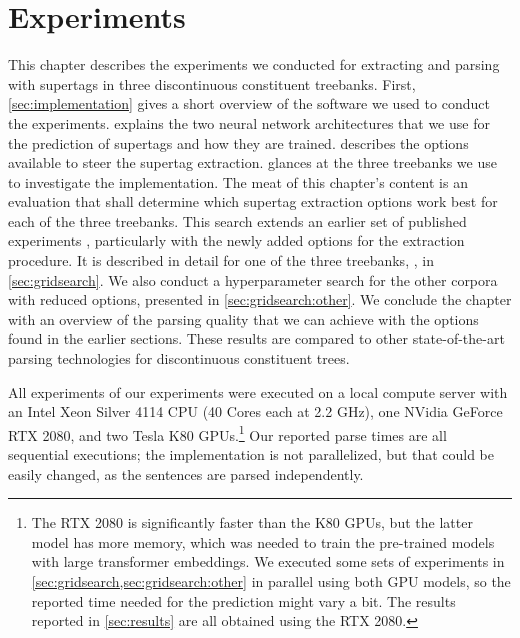 \documentclass[../document.tex]{subfiles}
\begin{document}
    \chapter{Experiments}\label{sec:experiments}
    This chapter describes the experiments we conducted for extracting and parsing with supertags in three discontinuous constituent treebanks.
    First, \cref{sec:implementation} gives a short overview of the software we used to conduct the experiments.
     explains the two neural network architectures that we use for the prediction of supertags and how they are trained.
     describes the options available to steer the supertag extraction.
     glances at the three treebanks we use to investigate the implementation.
    The meat of this chapter's content is an evaluation that shall determine which supertag extraction options work best for each of the three treebanks.
    This search extends an earlier set of published experiments \citep{Rup22}, particularly with the newly added options for the extraction procedure.
    It is described in detail for one of the three treebanks, \negra{}, in \cref{sec:gridsearch}.
    We also conduct a hyperparameter search for the other corpora with reduced options, presented in \cref{sec:gridsearch:other}.
    We conclude the chapter with an overview of the parsing quality that we can achieve with the options found in the earlier sections.
    These results are compared to other state-of-the-art parsing technologies for discontinuous constituent trees.

    All experiments of our experiments were executed on a local compute server with an Intel Xeon Silver 4114 CPU (40 Cores each at 2.2 GHz), one NVidia GeForce RTX 2080, and two Tesla K80 GPUs.\footnote{
        The RTX 2080 is significantly faster than the K80 GPUs, but the latter model has more memory, which was needed to train the pre-trained models with large transformer embeddings.
        We executed some sets of experiments in \cref{sec:gridsearch,sec:gridsearch:other} in parallel using both GPU models, so the reported time needed for the prediction might vary a bit.
        The results reported in \cref{sec:results} are all obtained using the RTX 2080.
    }
    Our reported parse times are all sequential executions; the implementation is not parallelized, but that could be easily changed, as the sentences are parsed independently.

    
    
    
    
    
    
    

    \ifSubfilesClassLoaded{%
        \printindex
    }{}
\end{document}
